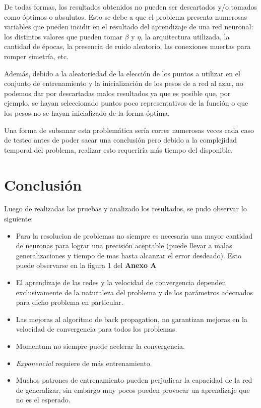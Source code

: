 \documentclass[%
    final,
    reprint,
    notitlepage,
    narroweqnarray,
    inline,
    twoside,
    invited
    ]{ieee}
\begin{document}
\par De todas formas, los resultados obtenidos no pueden ser descartados y/o tomados como óptimos o absulutos. Esto se debe a que el problema presenta numerosas variables que pueden incidir en el resultado del aprendizaje de una red neuronal: los distintos valores que pueden tomar $\beta$ y $\eta$, la arquitectura utilizada, la cantidad de épocas, la presencia de ruido aleatorio, las conexiones muertas para romper simetría, etc.\\

\par Además, debido a la aleatoriedad de la elección de los puntos a utilizar en el conjunto de entrenamiento y la inicialización de los pesos de a red al azar, no podemos dar por descartadas malos resultados ya que es posible que, por ejemplo, se hayan seleccionado puntos poco representativos de la función o que los pesos no se hayan inicializado de la forma óptima.
\par Una forma de subsanar esta problemática sería correr numerosas veces cada caso de testeo antes de poder sacar una conclusión pero debido a la complejidad temporal del problema, realizar esto requeriría más tiempo del disponible.


\section{Conclusión}

Luego de realizadas las pruebas y analizado los resultados, se pudo observar lo siguiente:\\
\begin{itemize}
\item Para la resolucion de problemas no siempre es necesaria una mayor cantidad de neuronas para lograr una precisión aceptable (puede llevar a malas generalizaciones y tiempo de mas hasta alcanzar el error desdeado). Esto puede observarse en la figura 1 del \textbf{Anexo A}\\
\item El aprendizaje de las redes y la velocidad de convergencia dependen exclusivamente de la naturaleza del problema y de los parámetros adecuados para dicho problema en particular.\\
\item Las mejoras al algoritmo de back propagation, no garantizan mejoras en la velocidad de convergencia para todos los problemas.\\
\item Momentum no siempre puede acelerar la convergencia.
\item \textit{Exponencial} requiere de más entrenamiento.
\item Muchos patrones de entrenamiento pueden perjudicar la capacidad de la red de generalizar, sin embargo muy pocos pueden provocar un aprendizaje que no es el esperado.\\
\end{itemize}
\end{document}
